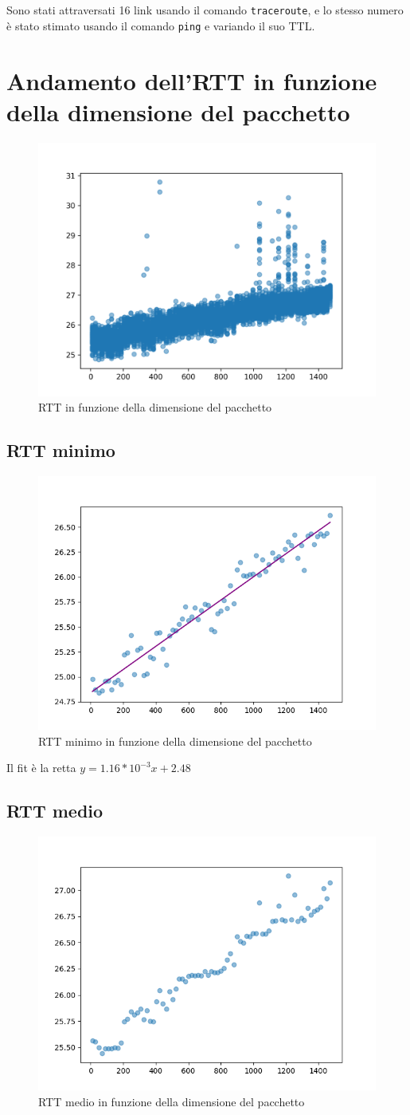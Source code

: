 \documentclass{article}
\begin{document}
Sono stati attraversati 16 link usando il comando \verb|traceroute|, e lo stesso numero è stato stimato usando il comando \verb|ping| e variando il suo TTL.

\section{Andamento dell'RTT in funzione della dimensione del pacchetto}

\begin{figure}[H]
  \centering
  \includegraphics[width=0.45\linewidth]{rtt_data.png}
  \caption{RTT in funzione della dimensione del pacchetto}
  \label{fig:rtt_data}
\end{figure}

\subsection{RTT minimo}

\begin{figure}[H]
  \centering
  \includegraphics[width=0.45\linewidth]{rtt_min_fit.png}
  \caption{RTT minimo in funzione della dimensione del pacchetto}
  \label{fig:rtt_min_data}
\end{figure}

Il fit è la retta $y = 1.16 * 10^{-3} x + 2.48$

\subsection{RTT medio}

\begin{figure}[H]
  \centering
  \includegraphics[width=0.45\linewidth]{rtt_avg_data.png}
  \caption{RTT medio in funzione della dimensione del pacchetto}
  \label{fig:rtt_avg_data}
\end{figure}
\end{document}
